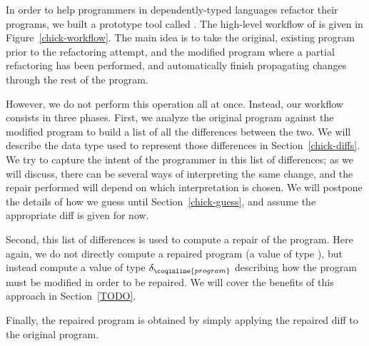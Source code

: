 In order to help programmers in dependently-typed languages refactor their
programs, we built a prototype tool called \Chick{}.  The high-level workflow of
\Chick{} is given in Figure~\ref{chick-workflow}.  The main idea is to take the
original, existing program prior to the refactoring attempt, and the modified
program where a partial refactoring has been performed, and automatically finish
propagating changes through the rest of the program.

However, we do not perform this operation all at once.  Instead, our workflow
consists in three phases.  First, we analyze the original program against the
modified program to build a list of all the differences between the two.  We
will describe the data type used to represent those differences in
Section~\ref{chick-diffs}.  We try to capture the intent of the programmer in
this list of differences; as we will discuss, there can be several ways of
interpreting the same change, and the repair performed will depend on which
interpretation is chosen.  We will postpone the details of how we guess until
Section~\ref{chick-guess}, and assume the appropriate diff is given for now.

Second, this list of differences is used to compute a repair of the program.
Here again, we do not directly compute a repaired program (a value of type
), but instead compute a value of type
$\delta_{\coqinline{program}}$ describing how the program must be modified in
order to be repaired.  We will cover the benefits of this approach in
Section~\ref{TODO}.

Finally, the repaired program is obtained by simply applying the repaired diff
to the original program.

